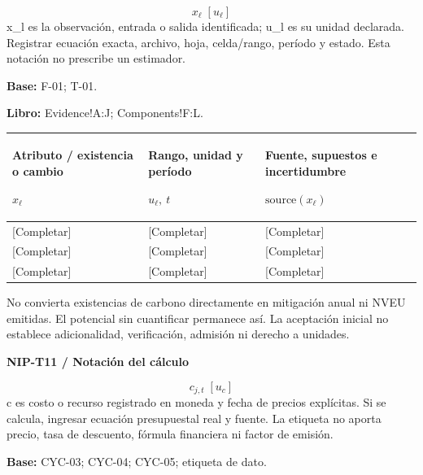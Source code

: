 {\fontsize{9}{11}\selectfont\[ x_{\ell}\;[u_{\ell}] \]}
x\_l es la observación, entrada o salida identificada; u\_l es su unidad declarada. Registrar ecuación exacta, archivo, hoja, celda/rango, período y estado. Esta notación no prescribe un estimador.\par
\textbf{Base:} F-01; T-01.\par
\textbf{Libro:} Evidence!A:J; Components!F:L.\par\endgroup
{\sffamily\fontsize{8.3}{10.3}\selectfont\begin{longtable}{@{}P{51.14mm} P{46.19mm} P{67.64mm}@{}}
\toprule
\textbf{Atributo / existencia o cambio}\par {\normalfont\fontsize{8.2}{10}\selectfont $x_{\ell}$} & \textbf{Rango, unidad y período}\par {\normalfont\fontsize{8.2}{10}\selectfont $u_{\ell},\ t$} & \textbf{Fuente, supuestos e incertidumbre}\par {\normalfont\fontsize{8.2}{10}\selectfont $\text{source}(x_{\ell})$}\\\midrule\endhead
\rule{0pt}{7.7mm}[Completar] & [Completar] & [Completar]\\\hline
\rule{0pt}{7.7mm}[Completar] & [Completar] & [Completar]\\\hline
\rule{0pt}{7.7mm}[Completar] & [Completar] & [Completar]\\\hline
\end{longtable}}
\begin{Notice}No convierta existencias de carbono directamente en mitigación anual ni NVEU emitidas. El potencial sin cuantificar permanece así. La aceptación inicial no establece adicionalidad, verificación, admisión ni derecho a unidades.\end{Notice}
\par\begingroup\sffamily\fontsize{8}{10}\selectfont\color{NEBGreen}\setlength{\parskip}{2pt}\setlength{\abovedisplayskip}{4pt}\setlength{\belowdisplayskip}{4pt}\setlength{\abovedisplayshortskip}{2pt}\setlength{\belowdisplayshortskip}{3pt}
\textbf{NIP-T11 / Notación del cálculo}\par
{\fontsize{9}{11}\selectfont\[ c_{j,t}\;[u_c] \]}
c es costo o recurso registrado en moneda y fecha de precios explícitas. Si se calcula, ingresar ecuación presupuestal real y fuente. La etiqueta no aporta precio, tasa de descuento, fórmula financiera ni factor de emisión.\par
\textbf{Base:} CYC-03; CYC-04; CYC-05; etiqueta de dato.\par
